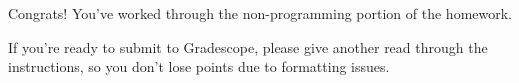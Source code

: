 Congrats! You've worked through the non-programming portion of the homework.

If you're ready to submit to Gradescope, please give another read through the instructions, so you don't lose points due to formatting issues.